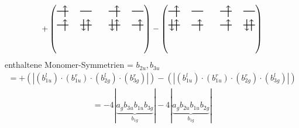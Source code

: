 \documentclass{article}
\begin{document}
\vspace{0.5cm}
\[ +\left(\text{\begin{tikzpicture}
    \draw[thick] (0,0) -- (0.5,0); %
    \draw[thick] (1,0) -- (1.5,0); %
    \draw[thick] (0,-0.6) -- (0.5,-0.6); %
    \draw[thick] (1,-0.6) -- (1.5,-0.6); %
\draw[->, thick] (0.35, -0.25) -- (0.35, 0.25); 
\draw[-> , thick] (0.35, -0.85) -- (0.35, -0.35); 
 \draw[-> , thick] (1.35, -0.85) -- (1.35, -0.35); 
\draw[<- , thick] (1.15, -0.85) -- (1.15, -0.35); 
\end{tikzpicture}\qquad \begin{tikzpicture}
    \draw[thick] (0,0) -- (0.5,0); %
    \draw[thick] (1,0) -- (1.5,0); %
    \draw[thick] (0,-0.6) -- (0.5,-0.6); %
    \draw[thick] (1,-0.6) -- (1.5,-0.6); %
\draw[->, thick] (0.35, -0.25) -- (0.35, 0.25); 
\draw[-> , thick] (0.35, -0.85) -- (0.35, -0.35); 
\draw[<- , thick] (0.15, -0.85) -- (0.15, -0.35); 
 \draw[-> , thick] (1.35, -0.85) -- (1.35, -0.35); 
\end{tikzpicture}}\right)-\left(\text{\begin{tikzpicture}
    \draw[thick] (0,0) -- (0.5,0); %
    \draw[thick] (1,0) -- (1.5,0); %
    \draw[thick] (0,-0.6) -- (0.5,-0.6); %
    \draw[thick] (1,-0.6) -- (1.5,-0.6); %
\draw[->, thick] (0.35, -0.25) -- (0.35, 0.25); 
\draw[-> , thick] (0.35, -0.85) -- (0.35, -0.35); 
\draw[<- , thick] (0.15, -0.85) -- (0.15, -0.35); 
 \draw[-> , thick] (1.35, -0.85) -- (1.35, -0.35); 
\end{tikzpicture}\qquad \begin{tikzpicture}
    \draw[thick] (0,0) -- (0.5,0); %
    \draw[thick] (1,0) -- (1.5,0); %
    \draw[thick] (0,-0.6) -- (0.5,-0.6); %
    \draw[thick] (1,-0.6) -- (1.5,-0.6); %
\draw[->, thick] (0.35, -0.25) -- (0.35, 0.25); 
\draw[-> , thick] (0.35, -0.85) -- (0.35, -0.35); 
 \draw[-> , thick] (1.35, -0.85) -- (1.35, -0.35); 
\draw[<- , thick] (1.15, -0.85) -- (1.15, -0.35); 
\end{tikzpicture}}\right)\]enthaltene Monomer-Symmetrien = $b_{2u},b_{3u}$\begin{multline*}=+\left(\left|(b_{1u}^{l}) \cdot (b_{1u}^{r}) \cdot (b_{2g}^{l}) \cdot (b_{3g}^{r})\right|\right)-\left(\left|(b_{1u}^{l}) \cdot (b_{1u}^{r}) \cdot (b_{2g}^{r}) \cdot (b_{3g}^{l})\right|\right)\end{multline*}
\begin{multline*}
=-4\left|\underbrace{a_{g} b_{3u} b_{1u} b_{3g}}_{b_{1g}}\right|-4\left|\underbrace{a_{g} b_{2u} b_{1u} b_{2g}}_{b_{1g}}\right|
\end{multline*}
\\\\
\end{document}
